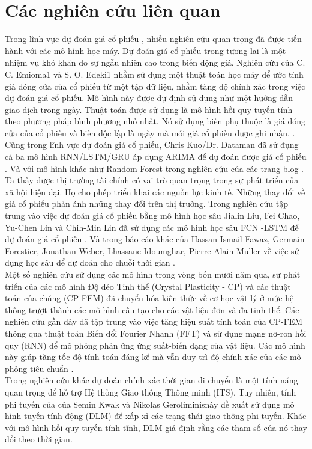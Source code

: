 \documentclass[conference]{IEEEtran}
\begin{document}
\section{Các nghiên cứu liên quan}
Trong lĩnh vực dự đoán giá cổ phiếu , nhiều nghiên cứu quan trọng đã được tiến hành với các mô hình học máy. Dự đoán giá cổ phiếu trong tương lai là một nhiệm vụ khó khăn do sự ngẫu nhiên cao trong biến động giá. Nghiên cứu của C. C. Emioma1 và S. O. Edeki1 nhằm sử dụng một thuật toán học máy để ước tính giá đóng cửa của cổ phiếu từ một tập dữ liệu, nhằm tăng độ chính xác trong việc dự đoán giá cổ phiếu. Mô hình này được dự định sử dụng như một hướng dẫn giao dịch trong ngày. Thuật toán được sử dụng là mô hình hồi quy tuyến tính theo phương pháp bình phương nhỏ nhất. Nó sử dụng biến phụ thuộc là giá đóng cửa của cổ phiếu và biến độc lập là ngày mà mỗi giá cổ phiếu được ghi nhận. \cite{b1}. 
Cũng trong lĩnh vực dự đoán giá cổ phiếu, Chris Kuo/Dr. Dataman đã sử đụng cả ba mô hình RNN/LSTM/GRU áp dụng ARIMA để dự đoán được giá cổ phiếu \cite{b2}. Và với mô hình khác như Random Forest trong nghiên cứu của các trang blog \cite{b3}.\\
Ta thấy được thị trường tài chính có vai trò quan trọng trong sự phát triển của xã hội hiện đại. Họ cho phép triển khai các nguồn lực kinh tế. Những thay đổi về giá cổ phiếu phản ánh những thay đổi trên thị trường. Trong nghiên cứu tập trung vào việc dự đoán giá cổ phiếu bằng mô hình học sâu Jialin Liu, Fei Chao, Yu-Chen Lin và Chih-Min Lin đã sử dụng các mô hình học sâu FCN -LSTM để dự đoán giá cổ phiếu \cite{b4}.
Và trong báo cáo khác của Hassan Ismail Fawaz, Germain Forestier, Jonathan Weber, Lhassane Idoumghar, Pierre-Alain Muller về việc sử dụng học sâu để dự đoán cho chuỗi thời gian \cite{b5}.\\
Một số nghiên cứu sử dụng các mô hình trong vòng bốn mươi năm qua, sự phát triển của các mô hình Độ dẻo Tinh thể (Crystal Plasticity - CP) và các thuật toán của chúng (CP-FEM) đã chuyển hóa kiến thức về cơ học vật lý ở mức hệ thống trượt thành các mô hình cấu tạo cho các vật liệu đơn và đa tinh thể. Các nghiên cứu gần đây đã tập trung vào việc tăng hiệu suất tính toán của CP-FEM thông qua thuật toán Biến đổi Fourier Nhanh (FFT) và sử dụng mạng nơ-ron hồi quy (RNN) để mô phỏng phản ứng ứng suất-biến dạng của vật liệu. Các mô hình này giúp tăng tốc độ tính toán đáng kể mà vẫn duy trì độ chính xác của các mô phỏng tiêu chuẩn \cite{b6}.\\
Trong nghiên cứu khác dự đoán chính xác thời gian di chuyển là một tính năng quan trọng để hỗ trợ Hệ thống Giao thông Thông minh (ITS). Tuy nhiên, tính phi tuyến của của Semin Kwak và Nikolas Geroliminisnày \cite{b7} đề xuất sử dụng mô hình tuyến tính động (DLM) để xấp xỉ các trạng thái giao thông phi tuyến. Khác với mô hình hồi quy tuyến tính tĩnh, DLM giả định rằng các tham số của nó thay đổi theo thời gian. 
\end{document}
